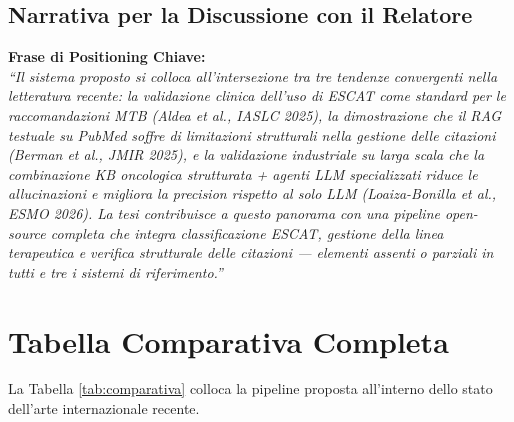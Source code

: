 \documentclass[12pt, a4paper]{article}
\begin{document}
\subsection{Narrativa per la Discussione con il Relatore}
\begin{insightbox}
\textbf{Frase di Positioning Chiave:}
\\
\textit{``Il sistema proposto si colloca all'intersezione tra tre tendenze convergenti nella letteratura recente: la validazione clinica dell'uso di ESCAT come standard per le raccomandazioni MTB (Aldea et al., IASLC 2025), la dimostrazione che il RAG testuale su PubMed soffre di limitazioni strutturali nella gestione delle citazioni (Berman et al., JMIR 2025), e la validazione industriale su larga scala che la combinazione KB oncologica strutturata + agenti LLM specializzati riduce le allucinazioni e migliora la precision rispetto al solo LLM (Loaiza-Bonilla et al., ESMO 2026). La tesi contribuisce a questo panorama con una pipeline open-source completa che integra classificazione ESCAT, gestione della linea terapeutica e verifica strutturale delle citazioni --- elementi assenti o parziali in tutti e tre i sistemi di riferimento.''}
\end{insightbox}

\newpage
\section{Tabella Comparativa Completa}
La Tabella \ref{tab:comparativa} colloca la pipeline proposta all'interno dello stato dell'arte internazionale recente.
\end{document}
